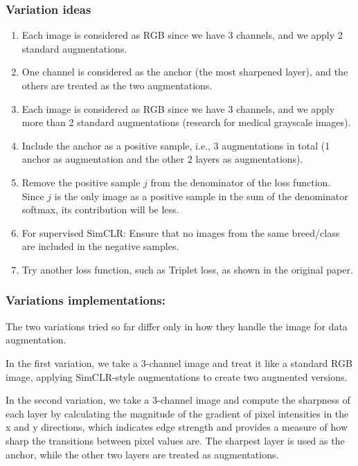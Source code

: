 \documentclass[a4paper,12pt]{report}
\begin{document}
\subsubsection{Variation ideas}

\begin{enumerate}
  \item Each image is considered as RGB since we have 3 channels, and we apply 2 standard augmentations.

  \item One channel is considered as the anchor (the most sharpened layer), and the others are treated as the two augmentations.

  \item Each image is considered as RGB since we have 3 channels, and we apply more than 2 standard augmentations (research for medical grayscale images).

  \item Include the anchor as a positive sample, i.e., 3 augmentations in total (1 anchor as augmentation and the other 2 layers as augmentations).

  \item Remove the positive sample \( j \) from the denominator of the loss function. Since \( j \) is the only image as a positive sample in the sum of the denominator softmax, its contribution will be less.

  \item For supervised SimCLR: Ensure that no images from the same breed/class are included in the negative samples.

  \item Try another loss function, such as Triplet loss, as shown in the original paper.
\end{enumerate}


\subsubsection{Variations implementations:}

The two variations tried so far differ only in how they handle the image for data augmentation. 

In the first variation, we take a 3-channel image and treat it like a standard RGB image, applying SimCLR-style augmentations to create two augmented versions.

In the second variation, we take a 3-channel image and compute the sharpness of each layer by calculating the magnitude of the gradient of pixel intensities in the x and y directions, which indicates edge strength and provides a measure of how sharp the transitions between pixel values are. The sharpest layer is used as the anchor, while the other two layers are treated as augmentations. 
\end{document}
